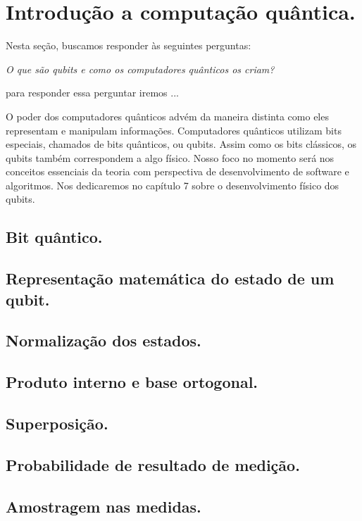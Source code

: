 \newpage
\section{Introdução a computação quântica.}

Nesta seção, buscamos responder às seguintes perguntas: 
\begin{center}
    \textit{O que são qubits e como os computadores quânticos os criam?}
\end{center}
para responder essa perguntar iremos ...

O poder dos computadores quânticos advém da maneira distinta como eles representam e manipulam informações. Computadores quânticos utilizam bits especiais, chamados de bits quânticos, ou qubits. Assim como os bits clássicos, os qubits também correspondem a algo físico. Nosso foco no momento será nos conceitos essenciais da teoria com perspectiva de desenvolvimento de software e algoritmos.
Nos dedicaremos no capítulo  7 sobre o desenvolvimento físico dos qubits.



\subsection{Bit quântico.}


\subsection*{Representação matemática do estado de um qubit.}

\subsection{Normalização dos estados.}

\subsection{Produto interno e base ortogonal.}

\subsection{Superposição.}

\subsection{Probabilidade de resultado de medição.}

\subsection*{Amostragem nas medidas.}

